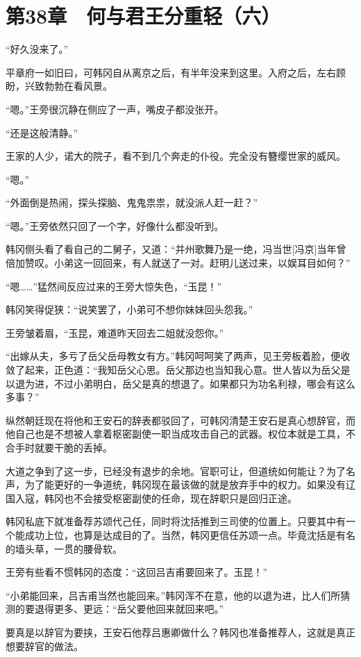 \section{第38章　何与君王分重轻（六）}

“好久没来了。”

平章府一如旧曰，可韩冈自从离京之后，有半年没来到这里。入府之后，左右顾盼，兴致勃勃在看风景。

“嗯。”王旁很沉静在侧应了一声，嘴皮子都没张开。

“还是这般清静。”

王家的人少，诺大的院子，看不到几个奔走的仆役。完全没有簪缨世家的威风。

“嗯。”

“外面倒是热闹，探头探脑、鬼鬼祟祟，就没派人赶一赶？”

“嗯。”王旁依然只回了一个字，好像什么都没听到。

韩冈侧头看了看自己的二舅子，又道：“并州歌舞乃是一绝，冯当世[冯京]当年曾倍加赞叹。小弟这一回回来，有人就送了一对。赶明儿送过来，以娱耳目如何？”

“嗯……”猛然间反应过来的王旁大惊失色，“玉昆！”

韩冈笑得促狭：“说笑罢了，小弟可不想你妹妹回头怨我。”

王旁皱着眉，“玉昆，难道昨天回去二姐就没怨你。”

“出嫁从夫，多亏了岳父岳母教女有方。”韩冈呵呵笑了两声，见王旁板着脸，便收敛了起来，正色道：“我知岳父心思。岳父那边也当知我心意。世人皆以为岳父是以退为进，不过小弟明白，岳父是真的想退了。如果都只为功名利禄，哪会有这么多事？”

纵然朝廷现在将他和王安石的辞表都驳回了，可韩冈清楚王安石是真心想辞官，而他自己也是不想被人拿着枢密副使一职当成攻击自己的武器。权位本就是工具，不合手时就要干脆的丢掉。

大道之争到了这一步，已经没有退步的余地。官职可让，但道统如何能让？为了名声，为了能更好的一争道统，韩冈现在最该做的就是放弃手中的权力。如果没有辽国入寇，韩冈也不会接受枢密副使的任命，现在辞职只是回归正途。

韩冈私底下就准备荐苏颂代己任，同时将沈括推到三司使的位置上。只要其中有一个能成功上位，也算是达成目的了。当然，韩冈更信任苏颂一点。毕竟沈括是有名的墙头草，一贯的腰骨软。

王旁有些看不惯韩冈的态度：“这回吕吉甫要回来了。玉昆！”

“小弟能回来，吕吉甫当然也能回来。”韩冈浑不在意，他的以退为进，比人们所猜测的要退得更多、更远：“岳父要他回来就回来吧。”

要真是以辞官为要挟，王安石他荐吕惠卿做什么？韩冈也准备推荐人，这就是真正想要辞官的做法。

